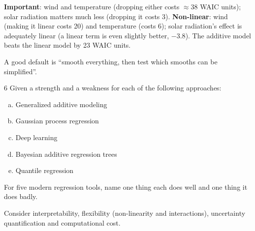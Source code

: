 \documentclass[11pt]{article}
\begin{document}
\begin{answer}
\textbf{Important}: wind and temperature (dropping either costs $\approx38$ WAIC units); solar radiation matters much less (dropping it costs 3). \textbf{Non-linear}: wind (making it linear costs 20) and temperature (costs 6); solar radiation's effect is adequately linear (a linear term is even slightly better, $-3.8$). The additive model beats the linear model by 23 WAIC units.
\end{answer}

\begin{takeaway}
A good default is ``smooth everything, then test which smooths can be simplified''.
\end{takeaway}


\begin{problem}{6}
Given a strength and a weakness for each of the following approaches:
\begin{enumerate}[(a)]
\item Generalized additive modeling
\item Gaussian process regression
\item Deep learning
\item Bayesian additive regression trees
\item Quantile regression
\end{enumerate}
\end{problem}

\begin{restate}
For five modern regression tools, name one thing each does well and one thing it does badly.
\end{restate}

\begin{keyidea}
Consider interpretability, flexibility (non-linearity and interactions), uncertainty quantification and computational cost.
\end{keyidea}
\end{document}
